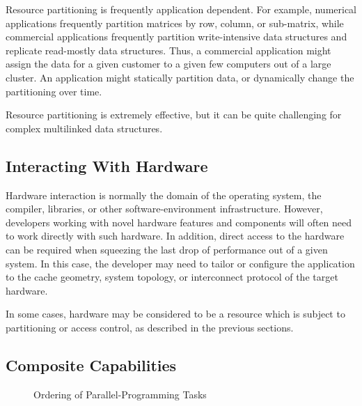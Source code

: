 Resource partitioning is frequently application dependent.
For example, numerical applications frequently partition matrices
by row, column, or sub-matrix, while commercial applications frequently
partition write-intensive data structures and replicate
read-mostly data structures.
Thus, a commercial application might assign the data for a
given customer to a given few computers out of a large cluster.
An application might statically partition data, or dynamically
change the partitioning over time.

Resource partitioning is extremely effective, but
it can be quite challenging for complex multilinked data
structures.

\subsection{Interacting With Hardware}
\label{sec:Interacting With Hardware}

Hardware interaction is normally the domain of the operating system,
the compiler, libraries, or other software-environment infrastructure.
However, developers working with novel hardware features and components
will often need to work directly with such hardware.
In addition, direct access to the hardware can be required when squeezing
the last drop of performance out of a given system.
In this case, the developer may need to tailor or configure the application
to the cache geometry, system topology, or interconnect protocol of the
target hardware.

In some cases, hardware may be considered to be a resource which
is subject to partitioning or access control, as described in
the previous sections.

\subsection{Composite Capabilities}
\label{sec:Composite Capabilities}

\begin{figure}[tb]
\centering
{}
\caption{Ordering of Parallel-Programming Tasks}
\label{fig:intro:Ordering of Parallel-Programming Tasks}
\end{figure}

